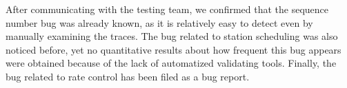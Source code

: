 After communicating with the testing team, we confirmed that the sequence number
bug was already known, as it is relatively easy to detect even by manually
examining the traces. The bug related to station scheduling was also noticed
before, yet no quantitative results about how frequent this bug appears were
obtained because of the lack of automatized validating tools. Finally, the bug
related to rate control has been filed as a bug report.
